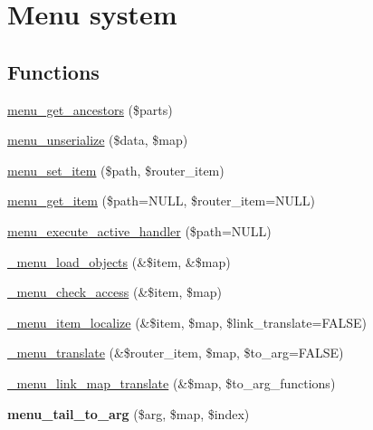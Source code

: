 \hypertarget{group__menu}{
\section{Menu system}
\label{group__menu}
}
\subsection*{Functions}
\begin{CompactItemize}
\item 
\hyperlink{group__menu_g24ddfa75da5f03482a2df2c9c8d1f711}{menu\_\-get\_\-ancestors} (\$parts)
\item 
\hyperlink{group__menu_g3f9fe4d53dc9d9c3724f956f1465b5be}{menu\_\-unserialize} (\$data, \$map)
\item 
\hyperlink{group__menu_g731543157fbe59176d20af2282df5f75}{menu\_\-set\_\-item} (\$path, \$router\_\-item)
\item 
\hyperlink{group__menu_g855b1ca6ef9e44eb6107a2b9d0f581df}{menu\_\-get\_\-item} (\$path=NULL, \$router\_\-item=NULL)
\item 
\hyperlink{group__menu_gc2cef001e8197fecd49924e6e0e251c6}{menu\_\-execute\_\-active\_\-handler} (\$path=NULL)
\item 
\hyperlink{group__menu_g8aeba67f5ade33d997f9869ce3e41fa6}{\_\-menu\_\-load\_\-objects} (\&\$item, \&\$map)
\item 
\hyperlink{group__menu_g255e3052e7679155b37b82d9bcbe19c9}{\_\-menu\_\-check\_\-access} (\&\$item, \$map)
\item 
\hyperlink{group__menu_g3b0c0f37db66372ac4e90afa35b191e9}{\_\-menu\_\-item\_\-localize} (\&\$item, \$map, \$link\_\-translate=FALSE)
\item 
\hyperlink{group__menu_g0e8535f35bcd1a03e71120a2d6ecc099}{\_\-menu\_\-translate} (\&\$router\_\-item, \$map, \$to\_\-arg=FALSE)
\item 
\hyperlink{group__menu_gac930b7a3cacbf70430c8dc3aa884198}{\_\-menu\_\-link\_\-map\_\-translate} (\&\$map, \$to\_\-arg\_\-functions)
\item 
\hypertarget{group__menu_gad6215c5bf31dffe08a2b75e66345d10}{
\textbf{menu\_\-tail\_\-to\_\-arg} (\$arg, \$map, \$index)}
\label{group__menu_gad6215c5bf31dffe08a2b75e66345d10}


\end{CompactItemize}
